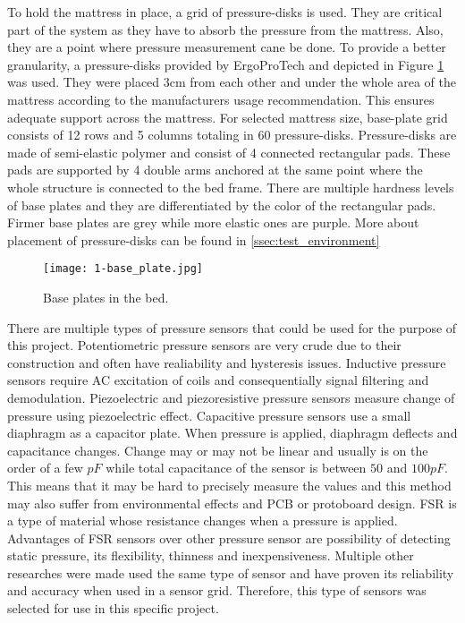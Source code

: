 To hold the mattress in place, a grid of pressure-disks is used. They are critical part of the system as they have to absorb the pressure from the mattress. Also, they are a point where pressure measurement cane be done. To provide a better granularity, a pressure-disks provided by ErgoProTech and depicted in Figure \ref{fig:base-plate} was used. They were placed 3cm from each other and under the whole area of the mattress according to the manufacturers usage recommendation. This ensures adequate support across the mattress. For selected mattress size, base-plate grid consists of 12 rows and 5 columns totaling in 60 pressure-disks. Pressure-disks are made of semi-elastic polymer and consist of 4 connected rectangular pads. These pads are supported by 4 double arms anchored at the same point where the whole structure is connected to the bed frame. There are multiple hardness levels of base plates and they are differentiated by the color of the rectangular pads. Firmer base plates are grey while more elastic ones are purple. More about placement of pressure-disks can be found in \autoref{ssec:test_environment}

\begin{figure}[h]
  \begin{center}
    \texttt{[image: 1-base\_plate.jpg]}
  \end{center}
  \caption{Base plates in the bed.}
  \label{fig:base-plate}
\end{figure}

There are multiple types of pressure sensors that could be used for the purpose of this project\cite{pressure_sensors}. Potentiometric pressure sensors are very crude due to their construction and often have realiability and hysteresis issues. Inductive pressure sensors require \ac{AC} excitation of coils and consequentially signal filtering and demodulation. Piezoelectric and piezoresistive pressure sensors measure change of pressure using piezoelectric effect. Capacitive pressure sensors use a small diaphragm as a capacitor plate. When pressure is applied, diaphragm deflects and capacitance changes. Change may or may not be linear and usually is on the order of a few $pF$ while total capacitance of the sensor is between $50$ and $100 pF$. This means that it may be hard to precisely measure the values and this method may also suffer from environmental effects and \ac{PCB} or protoboard design. \ac{FSR} is a type of material whose resistance changes when a pressure is applied. Advantages of \ac{FSR} sensors over other pressure sensor are possibility of detecting static pressure, its flexibility, thinness and inexpensiveness. Multiple other researches were made used the same type of sensor and have proven its reliability and accuracy when used in a sensor grid\cite{pillow_system_1}\cite{pillow_system_2}\cite{apnea_low_cost}. Therefore, this type of sensors was selected for use in this specific project.

